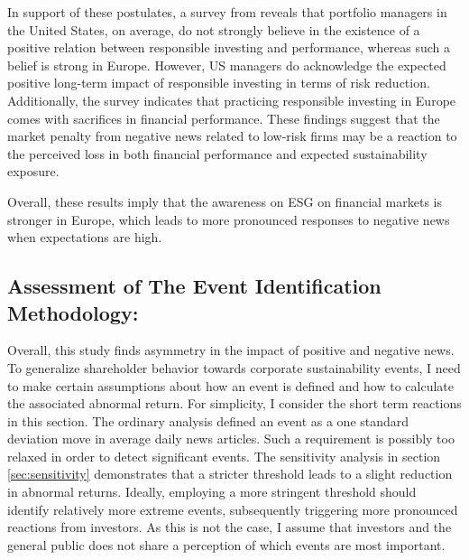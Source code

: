 In support of these postulates, a survey from \cite{van2016esg} reveals that portfolio managers in the United States, on average, do not strongly believe in the existence of a positive relation between responsible investing and performance, whereas such a belief is strong in Europe. However, US managers do acknowledge the expected positive long-term impact of responsible investing in terms of risk reduction. Additionally, the survey indicates that practicing responsible investing in Europe comes with sacrifices in financial performance. These findings suggest that the market penalty from negative news related to low-risk firms may be a reaction to the perceived loss in both financial performance and expected sustainability exposure.    


Overall, these results imply that the awareness on ESG on financial markets is stronger in Europe, which leads to more pronounced responses to negative news when expectations are high. 

\subsection{Assessment of The Event Identification Methodology:} \label{sec: discussion_event_study}

Overall, this study finds asymmetry in the impact of positive and negative news. To generalize shareholder behavior towards corporate sustainability events, I need to make certain assumptions about how an event is defined and how to calculate the associated abnormal return. For simplicity, I consider the short term reactions in this section. The ordinary analysis defined an event as a one standard deviation move in average daily news articles. Such a requirement is possibly too relaxed in order to detect significant events. The sensitivity analysis in section \ref{sec:sensitivity} demonstrates that a stricter threshold leads to a slight reduction in abnormal returns. Ideally, employing a more stringent threshold should identify relatively more extreme events, subsequently triggering more pronounced reactions from investors. As this is not the case, I assume that investors and the general public does not share a perception of which events are most important. 


